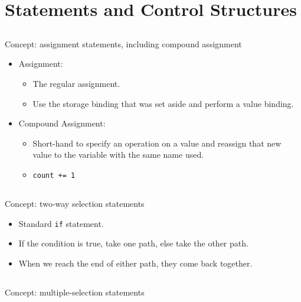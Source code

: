 \section{Statements and Control Structures}\label{sec:Statements_Control_Structures}

\subsection{}
Concept: assignment statements, including compound assignment

\begin{itemize}
\item Assignment:
  \begin{itemize}[noitemsep]
  \item The regular assignment.
  \item Use the storage binding that was set aside and perform a value binding.
  \end{itemize}

\item Compound Assignment:
  \begin{itemize}[noitemsep]
  \item Short-hand to specify an operation on a value and reassign that new value to the variable with the same name used.
  \item \texttt{count += 1}
  \end{itemize}
\end{itemize}

\subsection{}
Concept: two-way selection statements

\begin{itemize}[noitemsep]
\item Standard \texttt{if} statement.
\item If the condition is true, take one path, else take the other path.
\item When we reach the end of either path, they come back together.
\end{itemize}

\subsection{}
Concept: multiple-selection statements


